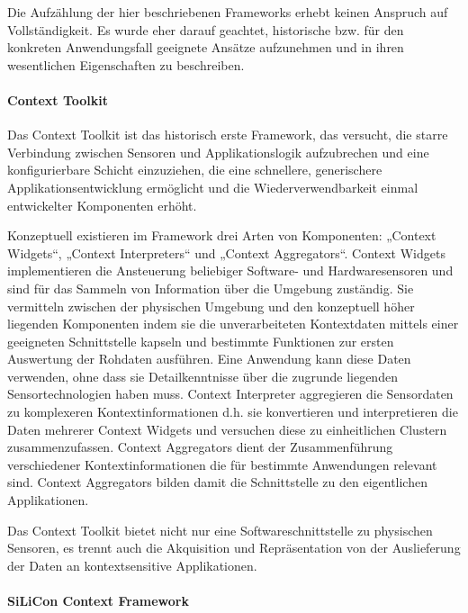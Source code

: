 Die Aufzählung der hier beschriebenen Frameworks erhebt keinen Anspruch auf Vollständigkeit. Es wurde eher darauf geachtet, historische bzw. für den konkreten Anwendungsfall geeignete Ansätze aufzunehmen und in ihren wesentlichen Eigenschaften zu beschreiben.

\paragraph{Context Toolkit} %
\label{par:context_toolkit}
 
Das Context Toolkit \citep{Dey01} ist das historisch erste Framework, das versucht, die starre Verbindung zwischen Sensoren und Applikationslogik aufzubrechen und eine konfigurierbare Schicht einzuziehen, die eine schnellere, generischere Applikationsentwicklung ermöglicht und die Wiederverwendbarkeit einmal entwickelter Komponenten erhöht.

Konzeptuell existieren im Framework drei Arten von Komponenten: „Context Widgets“, „Context Interpreters“ und „Context Aggregators“. Context Widgets implementieren die Ansteuerung beliebiger Software- und Hardwaresensoren und sind für das Sammeln von Information über die Umgebung zuständig. Sie vermitteln zwischen der physischen Umgebung und den konzeptuell höher liegenden Komponenten indem sie die unverarbeiteten Kontextdaten mittels einer geeigneten Schnittstelle kapseln und bestimmte Funktionen zur ersten Auswertung der Rohdaten ausführen. Eine Anwendung kann diese Daten verwenden, ohne dass sie Detailkenntnisse über die zugrunde liegenden Sensortechnologien haben muss. Context Interpreter aggregieren die Sensordaten zu komplexeren Kontextinformationen d.h. sie konvertieren und interpretieren die Daten mehrerer Context Widgets und versuchen diese zu einheitlichen Clustern zusammenzufassen. Context Aggregators dient der Zusammenführung verschiedener Kontextinformationen die für bestimmte Anwendungen relevant sind. Context Aggregators bilden damit die Schnittstelle zu den eigentlichen Applikationen.

Das Context Toolkit bietet nicht nur eine Softwareschnittstelle zu physischen Sensoren, es trennt auch die Akquisition und Repräsentation von der Auslieferung der Daten an kontextsensitive Applikationen.

\paragraph{SiLiCon Context Framework} %
\label{par:silicon_context_framework}

